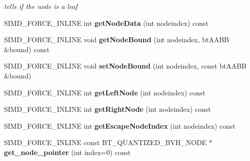 \begin{DoxyCompactItemize}
\begin{DoxyCompactList}\small\item\em tells if the node is a leaf \end{DoxyCompactList}\item 
\mbox{\label{classbtQuantizedBvhTree_aaca56e08e7846d74142ae87581f1890f}} 
S\+I\+M\+D\+\_\+\+F\+O\+R\+C\+E\+\_\+\+I\+N\+L\+I\+NE int {\bfseries get\+Node\+Data} (int nodeindex) const
\item 
\mbox{\label{classbtQuantizedBvhTree_a81bcb1746b0053b0f3a36ad33cd2b91c}} 
S\+I\+M\+D\+\_\+\+F\+O\+R\+C\+E\+\_\+\+I\+N\+L\+I\+NE void {\bfseries get\+Node\+Bound} (int nodeindex, bt\+A\+A\+BB \&bound) const
\item 
\mbox{\label{classbtQuantizedBvhTree_ad2904559dc545e9839112486d97fbe17}} 
S\+I\+M\+D\+\_\+\+F\+O\+R\+C\+E\+\_\+\+I\+N\+L\+I\+NE void {\bfseries set\+Node\+Bound} (int nodeindex, const bt\+A\+A\+BB \&bound)
\item 
\mbox{\label{classbtQuantizedBvhTree_aa38e3dbb5dfff41f742bbfed5e730932}} 
S\+I\+M\+D\+\_\+\+F\+O\+R\+C\+E\+\_\+\+I\+N\+L\+I\+NE int {\bfseries get\+Left\+Node} (int nodeindex) const
\item 
\mbox{\label{classbtQuantizedBvhTree_a02c5fb172851eb8fb44611eba4c2b366}} 
S\+I\+M\+D\+\_\+\+F\+O\+R\+C\+E\+\_\+\+I\+N\+L\+I\+NE int {\bfseries get\+Right\+Node} (int nodeindex) const
\item 
\mbox{\label{classbtQuantizedBvhTree_a5e2e3a1de3f78357d0724ee250b19202}} 
S\+I\+M\+D\+\_\+\+F\+O\+R\+C\+E\+\_\+\+I\+N\+L\+I\+NE int {\bfseries get\+Escape\+Node\+Index} (int nodeindex) const
\item 
\mbox{\label{classbtQuantizedBvhTree_affade16655e2665052f5fc7ce405ff04}} 
S\+I\+M\+D\+\_\+\+F\+O\+R\+C\+E\+\_\+\+I\+N\+L\+I\+NE const B\+T\+\_\+\+Q\+U\+A\+N\+T\+I\+Z\+E\+D\+\_\+\+B\+V\+H\+\_\+\+N\+O\+DE $\ast$ {\bfseries get\+\_\+node\+\_\+pointer} (int index=0) const
\end{DoxyCompactItemize}


